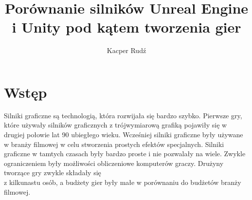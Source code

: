 \documentclass[12pt,twoside]{article}
\author{Kacper Rudź}
\title{Porównanie silników Unreal Engine i Unity pod kątem tworzenia gier}
\begin{document}
\maketitle

\blankpage

\tableofcontents

\clearpage
\blankpage




\section{Wstęp}

Silniki graficzne są technologią, która rozwijała się bardzo szybko. Pierwsze gry, które używały
silników graficznych z trójwymiarową grafiką pojawiły się w drugiej połowie lat 90 ubiegłego wieku.
Wcześniej silniki graficzne były używane w branży filmowej w celu stworzenia prostych efektów
specjalnych. Silniki graficzne w tamtych czasach były bardzo proste i nie pozwalały na wiele. Zwykle
ograniczeniem były możliwości obliczeniowe komputerów graczy. Drużyny tworzące gry zwykle
składały się\\z kilkunastu osób, a budżety gier były małe w porównaniu do budżetów branży filmowej.
\end{document}
